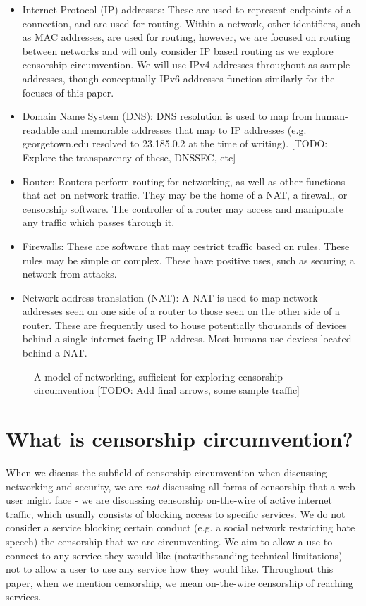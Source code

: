 \documentclass[12pt]{report}
\begin{document}
\begin{itemize}
  \item Internet Protocol (IP) addresses: These are used to represent endpoints of a connection, and are used for routing. Within a network, other identifiers, such as MAC addresses, are used for routing, however, we are focused on routing between networks and will only consider IP based routing as we explore censorship circumvention. We will use IPv4 addresses throughout as sample addresses, though conceptually IPv6 addresses function similarly for the focuses of this paper.
  \item Domain Name System (DNS): DNS resolution is used to map from human-readable and memorable addresses that map to IP addresses (e.g. georgetown.edu resolved to 23.185.0.2 at the time of writing). [TODO: Explore the transparency of these, DNSSEC, etc]
  \item Router: Routers perform routing for networking, as well as other functions that act on network traffic. They may be the home of a NAT, a firewall, or censorship software. The controller of a router may access and manipulate any traffic which passes through it.
  \item Firewalls: These are software that may restrict traffic based on rules. These rules may be simple or complex. These have positive uses, such as securing a network from attacks.
  \item Network address translation (NAT): A NAT is used to map network addresses seen on one side of a router to those seen on the other side of a router. These are frequently used to house potentially thousands of devices behind a single internet facing IP address. Most humans use devices located behind a NAT.
\end{itemize}

\begin{figure}
\begin{center}
{}
\end{center}
\caption[Basic networking]{A model of networking, sufficient for exploring censorship circumvention [TODO: Add final arrows, some sample traffic]}
\end{figure}

\section{What is censorship circumvention?}
\label{circumvention}

When we discuss the subfield of censorship circumvention when discussing networking and security, we are \emph{not} discussing all forms of censorship that a web user might face - we are discussing censorship on-the-wire of active internet traffic, which usually consists of blocking access to specific services. We do not consider a service blocking certain conduct (e.g. a social network restricting hate speech) the censorship that we are circumventing. We aim to allow a use to connect to any service they would like (notwithstanding technical limitations) - not to allow a user to use any service how they would like. Throughout this paper, when we mention censorship, we mean on-the-wire censorship of reaching services.
\end{document}
